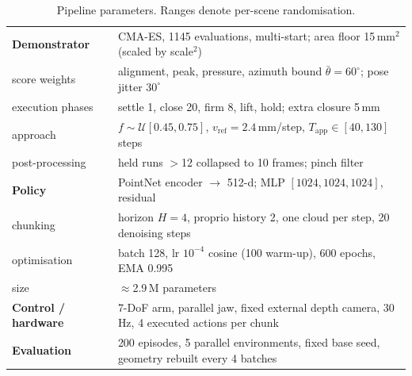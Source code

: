 \begin{table}[t]
\begin{tabular}{ll}
\midrule
\textbf{Demonstrator} & CMA-ES, 1145 evaluations, multi-start; area floor 15\,mm$^2$
                        (scaled by scale$^2$) \\
\quad score weights & alignment, peak, pressure, azimuth bound $\bar\theta = 60^\circ$;
                      pose jitter $30^\circ$ \\
\quad execution phases & settle 1, close 20, firm 8, lift, hold; extra closure 5\,mm \\
\quad approach & $f\!\sim\!\mathcal{U}[0.45,0.75]$, $v_{\text{ref}}\!=\!2.4$\,mm/step,
                 $T_{\text{app}}\!\in\![40,130]$ steps \\
\quad post-processing & held runs $>$12 collapsed to 10 frames; pinch filter \\
\midrule
\textbf{Policy} & PointNet encoder $\rightarrow$ 512-d; MLP $[1024,1024,1024]$, residual \\
\quad chunking & horizon $H\!=\!4$, proprio history 2, one cloud per step, 20 denoising steps \\
\quad optimisation & batch 128, lr $10^{-4}$ cosine (100 warm-up), 600 epochs, EMA 0.995 \\
\quad size & $\approx$2.9\,M parameters \\
\midrule
\textbf{Control / hardware} & 7-DoF arm, parallel jaw, fixed external depth camera, 30\,Hz,
                              4 executed actions per chunk \\
\midrule
\textbf{Evaluation} & 200 episodes, 5 parallel environments, fixed base seed,
                      geometry rebuilt every 4 batches \\
\bottomrule
\end{tabular}
\caption{Pipeline parameters. Ranges denote per-scene randomisation.}
\label{tab:params}
\end{table}
